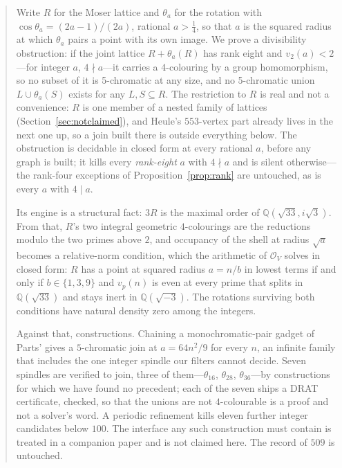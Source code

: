 \documentclass[11pt,reqno]{amsart}
\theoremstyle{plain}
\theoremstyle{definition}
\newcommand{\Q}{\mathbb{Q}}
\newcommand{\Lat}{R}
\newcommand{\Ok}{\mathcal{O}}
\begin{document}
\begin{abstract}
Write $\Lat$ for the Moser lattice and $\theta_a$ for the rotation with
$\cos\theta_a = (2a-1)/(2a)$, rational $a > \tfrac14$, so that $a$ is the squared
radius at which
$\theta_a$ pairs a point with its own image. We prove a divisibility obstruction:
if the joint lattice $\Lat + \theta_a(\Lat)$ has rank eight and $v_2(a) < 2$---for
integer $a$, $4 \nmid a$---it
carries a $4$-colouring by a group homomorphism, so no subset of it is
5-chromatic at any size, and no 5-chromatic union $L \cup \theta_a(S)$ exists for
any $L, S \subseteq \Lat$. The restriction to $\Lat$ is real and not a
convenience: $\Lat$ is one member of a nested family of lattices
(Section~\ref{sec:notclaimed}), and Heule's $553$-vertex part already lives in
the next one up, so a join built there is outside everything below. The obstruction is decidable in closed form at every
rational $a$, before any graph is built; it kills every \emph{rank-eight} $a$
with $4 \nmid a$ and is silent otherwise---the rank-four exceptions of
Proposition~\ref{prop:rank} are untouched, as is every $a$ with $4 \mid a$.

Its engine is a structural fact: $3\Lat$ is the maximal order of
$\Q(\sqrt{33}, i\sqrt3)$. From that, $\Lat$'s two integral geometric
$4$-colourings are the reductions modulo the two primes above $2$, and occupancy
of the shell at radius $\sqrt a$ becomes a relative-norm condition, which the
arithmetic of $\Ok_V$ solves in closed form: $\Lat$ has a point at squared radius $a = n/b$ in
lowest terms if and only if $b \in \{1,3,9\}$ and $v_p(n)$ is even at every prime
that splits in $\Q(\sqrt{33})$ and stays inert in $\Q(\sqrt{-3})$. The rotations
surviving both conditions have natural density zero among the integers.

Against that, constructions. Chaining a monochromatic-pair gadget of Parts' gives
a $5$-chromatic join at $a = 64n^2/9$ for every $n$, an infinite family that
includes the one integer spindle our filters cannot decide. Seven spindles are
verified to join, three of them---$\theta_{16}$, $\theta_{28}$,
$\theta_{36}$---by constructions for which we have found no precedent; each of
the seven ships a DRAT certificate, checked, so that the unions are not
$4$-colourable is a proof and not a solver's word. A periodic
refinement kills eleven further integer candidates below $100$. The interface any such
construction must contain is treated in a companion paper and is not claimed
here. The record of $509$ is untouched.
\end{abstract}
\end{document}
